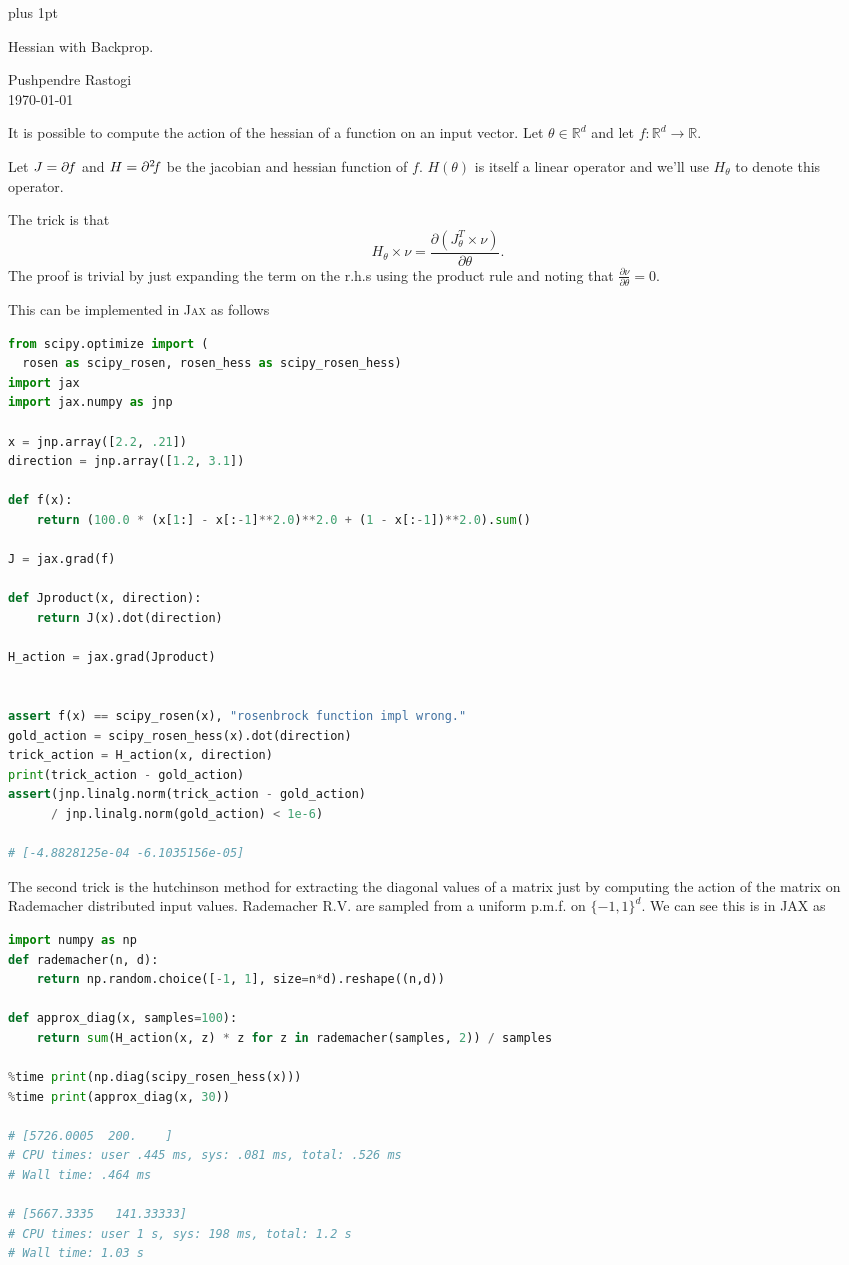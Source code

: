 \documentclass[preview,border={30 30 30 30}]{standalone}
\begin{document}
\parskip=5pt plus 1pt
\begin{center}
    \Large Hessian with Backprop.
\end{center}
Pushpendre Rastogi\\
\today

It is possible to compute the action of the hessian of a function on an input vector. Let $\theta \in \mathbb{R}^d$ and let $f: \mathbb{R}^d \rightarrow \mathbb{R}$.

Let $J = \partial\kern-1pt f$ and $H = \partial^2\kern-2pt f$ be the jacobian and hessian function of $f$. $H(\theta)$ is itself a linear operator and we'll use $H_\theta$ to denote this operator. 

The trick is that $$H_\theta \times \nu = \frac{\partial (J_\theta^T \times \nu)}{\partial \theta}.$$ The proof is trivial by just expanding the term on the r.h.s using the product rule and noting that $\frac{\partial \nu}{\partial \theta} = 0$.

This can be implemented in \textsc{Jax} as follows

\begin{lstlisting}[language=python]
from scipy.optimize import (
  rosen as scipy_rosen, rosen_hess as scipy_rosen_hess)
import jax
import jax.numpy as jnp

x = jnp.array([2.2, .21])
direction = jnp.array([1.2, 3.1])

def f(x):
    return (100.0 * (x[1:] - x[:-1]**2.0)**2.0 + (1 - x[:-1])**2.0).sum()
    
J = jax.grad(f)

def Jproduct(x, direction):
    return J(x).dot(direction)
    
H_action = jax.grad(Jproduct)


assert f(x) == scipy_rosen(x), "rosenbrock function impl wrong."
gold_action = scipy_rosen_hess(x).dot(direction)
trick_action = H_action(x, direction)
print(trick_action - gold_action)
assert(jnp.linalg.norm(trick_action - gold_action) 
      / jnp.linalg.norm(gold_action) < 1e-6)

# [-4.8828125e-04 -6.1035156e-05]
\end{lstlisting}

The second trick is the hutchinson method for extracting the diagonal values of a matrix just by computing the action of the matrix on Rademacher distributed input values. Rademacher R.V. are sampled from a uniform p.m.f. on $\{-1, 1\}^d$. We can see this is in JAX as 

\begin{lstlisting}[language=python]
import numpy as np
def rademacher(n, d):
    return np.random.choice([-1, 1], size=n*d).reshape((n,d))

def approx_diag(x, samples=100):
    return sum(H_action(x, z) * z for z in rademacher(samples, 2)) / samples

%time print(np.diag(scipy_rosen_hess(x)))
%time print(approx_diag(x, 30))

# [5726.0005  200.    ]
# CPU times: user .445 ms, sys: .081 ms, total: .526 ms
# Wall time: .464 ms

# [5667.3335   141.33333]
# CPU times: user 1 s, sys: 198 ms, total: 1.2 s
# Wall time: 1.03 s
\end{lstlisting}
\end{document}
